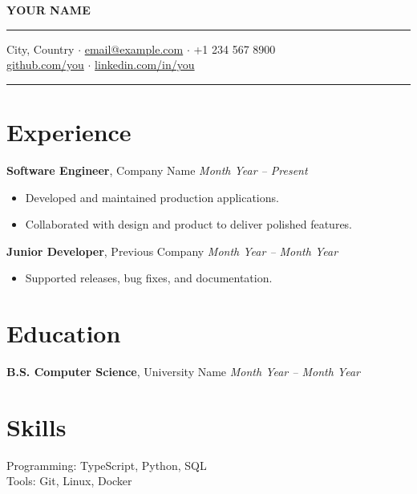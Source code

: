 \documentclass[11pt,a4paper]{article}
\begin{document}
\begin{center}
  {\Large\bfseries YOUR NAME}\\[4pt]
  \hrule
  \vspace{6pt}
  {\small City, Country $\cdot$
  \href{mailto:email@example.com}{email@example.com} $\cdot$
  +1 234 567 8900}\\[2pt]
  {\small
  \href{https://github.com/}{github.com/you} $\cdot$
  \href{https://linkedin.com/in/}{linkedin.com/in/you}}
  \vspace{4pt}
  \hrule
\end{center}

\vspace{8pt}

\section*{Experience}
\textbf{Software Engineer}, Company Name \hfill \textit{Month Year -- Present}
\begin{itemize}
  \item Developed and maintained production applications.
  \item Collaborated with design and product to deliver polished features.
\end{itemize}

\textbf{Junior Developer}, Previous Company \hfill \textit{Month Year -- Month Year}
\begin{itemize}
  \item Supported releases, bug fixes, and documentation.
\end{itemize}

\section*{Education}
\textbf{B.S. Computer Science}, University Name \hfill \textit{Month Year -- Month Year}

\section*{Skills}
Programming: TypeScript, Python, SQL\\
Tools: Git, Linux, Docker
\end{document}
